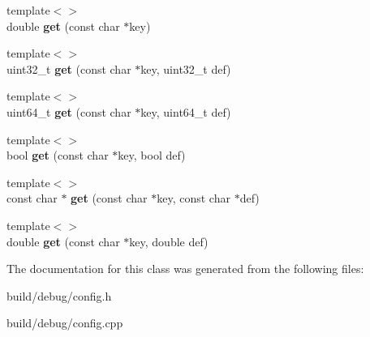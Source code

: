 \begin{DoxyCompactItemize}
\item 
\hypertarget{classConfig_a9fb644c76122da00f0396cca69fdb854}{{\footnotesize template$<$$>$ }\\double {\bfseries get} (const char $\ast$key)}\label{classConfig_a9fb644c76122da00f0396cca69fdb854}

\item 
\hypertarget{classConfig_a01503b0fe03e702ac42cc71025496cc7}{{\footnotesize template$<$$>$ }\\uint32\-\_\-t {\bfseries get} (const char $\ast$key, uint32\-\_\-t def)}\label{classConfig_a01503b0fe03e702ac42cc71025496cc7}

\item 
\hypertarget{classConfig_ab7c8f41f1f68386d5c5aa220b04a6395}{{\footnotesize template$<$$>$ }\\uint64\-\_\-t {\bfseries get} (const char $\ast$key, uint64\-\_\-t def)}\label{classConfig_ab7c8f41f1f68386d5c5aa220b04a6395}

\item 
\hypertarget{classConfig_aeb1e3d9528ac85d99ac240c127a230fe}{{\footnotesize template$<$$>$ }\\bool {\bfseries get} (const char $\ast$key, bool def)}\label{classConfig_aeb1e3d9528ac85d99ac240c127a230fe}

\item 
\hypertarget{classConfig_a7d43af7622dab5c20df7a02d0438db0f}{{\footnotesize template$<$$>$ }\\const char $\ast$ {\bfseries get} (const char $\ast$key, const char $\ast$def)}\label{classConfig_a7d43af7622dab5c20df7a02d0438db0f}

\item 
\hypertarget{classConfig_ae495cbb8c0575c30e9539d8ed6082a72}{{\footnotesize template$<$$>$ }\\double {\bfseries get} (const char $\ast$key, double def)}\label{classConfig_ae495cbb8c0575c30e9539d8ed6082a72}

\end{DoxyCompactItemize}


The documentation for this class was generated from the following files\-:\begin{DoxyCompactItemize}
\item 
build/debug/config.\-h\item 
build/debug/config.\-cpp\end{DoxyCompactItemize}
